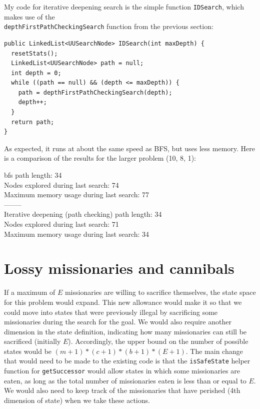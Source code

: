 \documentclass{article}
\begin{document}
My code for iterative deepening search is the simple function \verb`IDSearch`, which makes use of the\\
 \verb`depthFirstPathCheckingSearch` function from the previous section:

\vspace{8mm}

\begin{lstlisting}
public LinkedList<UUSearchNode> IDSearch(int maxDepth) {
  resetStats();
  LinkedList<UUSearchNode> path = null;
  int depth = 0;
  while ((path == null) && (depth <= maxDepth)) {
    path = depthFirstPathCheckingSearch(depth);
    depth++;
  }
  return path;
}
\end{lstlisting}

As expected, it runs at about the same speed as BFS, but uses less memory. Here is a comparison of the results for the larger problem (10, 8, 1):

\vspace{5mm}

{\setlength{\parindent}{0cm}
bfs path length:  34\\
Nodes explored during last search: 74\\
Maximum memory usage during last search: 77\\
--------\\
Iterative deepening (path checking) path length: 34\\
Nodes explored during last search: 71\\
Maximum memory usage during last search: 34}\\


\section{Lossy missionaries and cannibals}

If a maximum of $E$ missionaries are willing to sacrifice themselves, the state space for this problem would expand. This new allowance would make it so that we could move into states that were previously illegal by sacrificing some missionaries during the search for the goal. We would also require another dimension in the state definition, indicating how many missionaries can still be sacrificed (initially $E$). Accordingly, the upper bound on the number of possible states would be $(m+1)*(c+1)*(b+1)*(E+1)$. The main change that would need to be made to the existing code is that the \verb`isSafeState` helper function for \verb`getSuccessor` would allow states in which some missionaries are eaten, as long as the total number of missionaries eaten is less than or equal to $E$. We would also need to keep track of the missionaries that have perished (4th dimension of state) when we take these actions.
\end{document}
